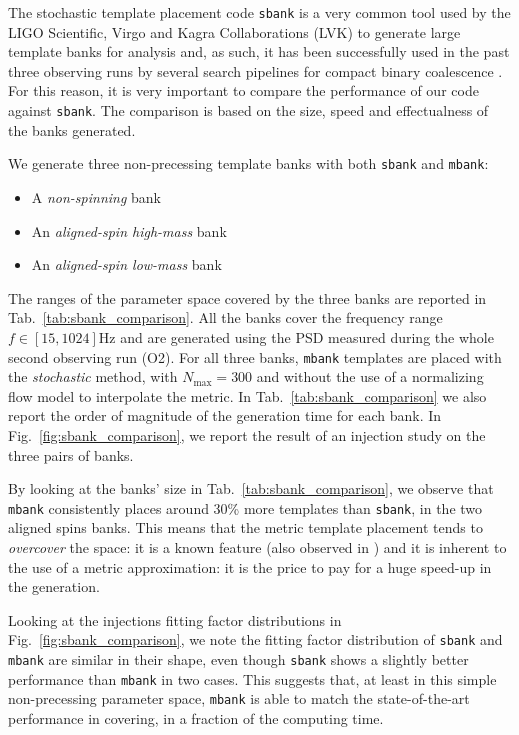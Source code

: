 \documentclass[twocolumn,showpacs,preprintnumbers,nofootinbib,prd,
superscriptaddress,10pt]{revtex4-2}
\begin{document}
The stochastic template placement code \texttt{sbank} \cite{Ajith:2012mn} is a very common tool used by the LIGO Scientific, Virgo and Kagra Collaborations (LVK) to generate large template banks for analysis and, as such, it has been successfully used in the past three observing runs by several search pipelines for compact binary coalescence \cite{Usman:2015kfa, Mukherjee:2018yra, Aubin:2020goo}.
For this reason, it is very important to compare the performance of our code against \texttt{sbank}. The comparison is based on the size, speed and effectualness of the banks generated.

We generate three non-precessing template banks with both \texttt{sbank} and \texttt{mbank}:
\begin{itemize}
	\item A {\it non-spinning} bank
	\item An {\it aligned-spin high-mass} bank
	\item An {\it aligned-spin low-mass} bank
\end{itemize}
The ranges of the parameter space covered by the three banks are reported in Tab.~\ref{tab:sbank_comparison}. All the banks cover the frequency range $f\in [15,1024] \text{Hz}$ and are generated using the PSD measured during the whole second observing run (O2).
For all three banks, \texttt{mbank} templates are placed with the {\it stochastic} method, with $N_\text{max}=300$ and without the use of a normalizing flow model to interpolate the metric. In Tab.~\ref{tab:sbank_comparison} we also report the order of magnitude of the generation time for each bank.
In Fig.~\ref{fig:sbank_comparison}, we report the result of an injection study on the three pairs of banks.

By looking at the banks' size in Tab.~\ref{tab:sbank_comparison}, we observe that \texttt{mbank} consistently places around 30\% more templates than \texttt{sbank}, in the two aligned spins banks. This means that the metric template placement tends to \textit{overcover} the space: it is a known feature (also observed in \cite{Coogan:2022qxs}) and it is inherent to the use of a metric approximation: it is the price to pay for a huge speed-up in the generation.

Looking at the injections fitting factor distributions in Fig.~\ref{fig:sbank_comparison}, we note the fitting factor distribution of \texttt{sbank} and \texttt{mbank} are similar in their shape, even though \texttt{sbank} shows a slightly better performance than \texttt{mbank} in two cases. This suggests that, at least in this simple non-precessing parameter space, \texttt{mbank} is able to match the state-of-the-art performance in covering, in a fraction of the computing time.
\end{document}
